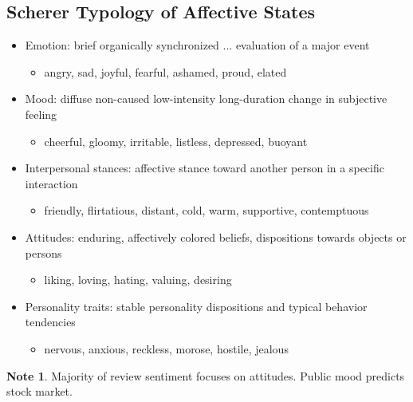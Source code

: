 \documentclass[11pt]{article}
\theoremstyle{definition}
\newtheorem{note}{Note}
\begin{document}
\subsection{Scherer Typology of Affective States}
\begin{itemize}
  \item Emotion: brief organically synchronized ... evaluation of a major event
  \begin{itemize}
  \item angry, sad, joyful, fearful, ashamed, proud, elated
  \end{itemize}
  \item Mood: diffuse non-caused low-intensity long-duration change in subjective feeling
  \begin{itemize}
    \item cheerful, gloomy, irritable, listless, depressed, buoyant
  \end{itemize}
  \item Interpersonal stances: affective stance toward another person in a specific interaction
  \begin{itemize}
    \item friendly, flirtatious, distant, cold, warm, supportive, contemptuous
  \end{itemize}
  \item Attitudes: enduring, affectively colored beliefs, dispositions towards objects or persons
  \begin{itemize}
    \item liking, loving, hating, valuing, desiring
  \end{itemize}
  \item Personality traits: stable personality dispositions and typical behavior tendencies
  \begin{itemize}
    \item nervous, anxious, reckless, morose, hostile, jealous
  \end{itemize}
\end{itemize}
\begin{note}
  Majority of review sentiment focuses on attitudes. Public mood predicts stock market.
\end{note}
\end{document}
